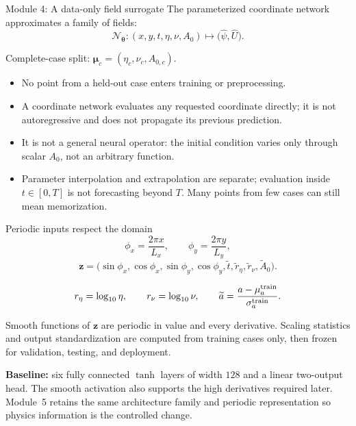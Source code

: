 \documentclass[aspectratio=169,11pt]{beamer}
\newcommand{\vect}[1]{\bm{#1}}
\newcommand{\currentmodule}{Module 1}
\newcommand{\moduleprogress}{1 of 6}
\newcommand{\setmodule}[2]{%
  \renewcommand{\currentmodule}{#1}%
  \renewcommand{\moduleprogress}{#2}%
}
\begin{document}
\setmodule{Module 4}{1 of 4}
\begin{frame}{Module 4: A data-only field surrogate}
The parameterized coordinate network approximates a family of fields:
\[
\boxed{
\mathcal N_{\vect\theta}:
(x,y,t,\eta,\nu,A_0)
\longmapsto
\bigl(\widehat\psi,\widehat U\bigr).}
\]

Complete-case split: $\vect\mu_c=(\eta_c,\nu_c,A_{0,c})$.
\begin{itemize}
  \item No point from a held-out case enters training or preprocessing.
  \item A coordinate network evaluates any requested coordinate directly; it is not autoregressive and does not propagate its previous prediction.
  \item It is not a general neural operator: the initial condition varies only through scalar $A_0$, not an arbitrary function.
  \item Parameter interpolation and extrapolation are separate; evaluation inside $t\in[0,T]$ is not forecasting beyond $T$. Many points from few cases can still mean memorization.
\end{itemize}
\end{frame}

\setmodule{Module 4}{2 of 4}
\begin{frame}{Periodic inputs respect the domain}
\[
\phi_x=\frac{2\pi x}{L_x},
\qquad
\phi_y=\frac{2\pi y}{L_y},
\]
\[
\vect z=
\bigl(
\sin\phi_x,\cos\phi_x,
\sin\phi_y,\cos\phi_y,
\widetilde t,\widetilde r_\eta,\widetilde r_\nu,\widetilde A_0
\bigr).
\]

\[
r_\eta=\log_{10}\eta,
\qquad
r_\nu=\log_{10}\nu,
\qquad
\widetilde a=\frac{a-\mu_a^{\rm train}}{\sigma_a^{\rm train}}.
\]

Smooth functions of $\vect z$ are periodic in value and every derivative.  Scaling statistics and output standardization are computed from training cases only, then frozen for validation, testing, and deployment.

\textbf{Baseline:} six fully connected $\tanh$ layers of width $128$ and a linear two-output head.  The smooth activation also supports the high derivatives required later.  Module~5 retains the same architecture family and periodic representation so physics information is the controlled change.
\end{frame}
\end{document}
